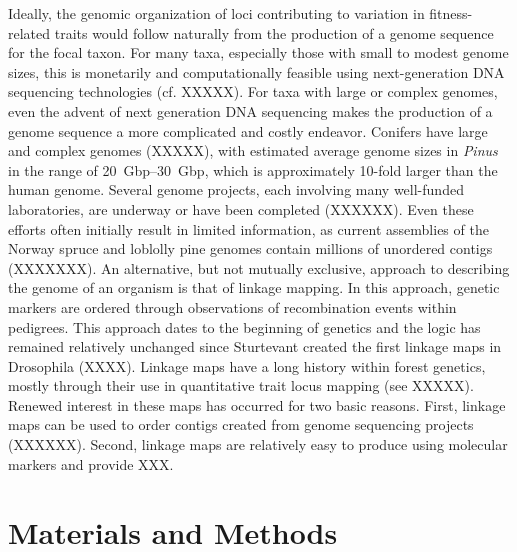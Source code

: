 \documentclass[11pt]{article}
\begin{document}
Ideally, the genomic organization of loci contributing to variation in fitness-related traits would follow naturally
from the production of a genome sequence for the focal taxon. For many taxa, especially those with small to modest genome sizes,
this is monetarily and computationally feasible using next-generation DNA sequencing technologies (cf. XXXXX). For taxa with large or complex
genomes, even the advent of next generation DNA sequencing makes the production of a genome sequence a more complicated
and costly endeavor. Conifers have large and complex genomes (XXXXX), with estimated average genome sizes in \textit{Pinus} in the range of \SIrange{20}{30}{Gbp},
which is approximately 10-fold larger than the human genome. Several genome projects, each involving many well-funded laboratories, are
underway or have been completed (XXXXXX). Even these efforts often initially result in limited information, as current assemblies of the Norway spruce and
loblolly pine genomes contain millions of unordered contigs (XXXXXXX). An alternative, but not mutually exclusive, approach to describing the genome of an
organism is that of linkage mapping. In this approach, genetic markers are ordered through observations of recombination events within pedigrees. This approach
dates to the beginning of genetics and the logic has remained relatively unchanged since Sturtevant created the first 
linkage maps in Drosophila (XXXX). Linkage maps have a long history within forest genetics, mostly through their use in quantitative trait locus
mapping (see XXXXX). Renewed interest in these maps has occurred for two basic reasons. First, linkage maps can be used to order contigs created
from genome sequencing projects (XXXXXX). Second,  linkage maps are relatively easy to produce using molecular markers and provide 
XXX.


\section{Materials and Methods}
\end{document}
